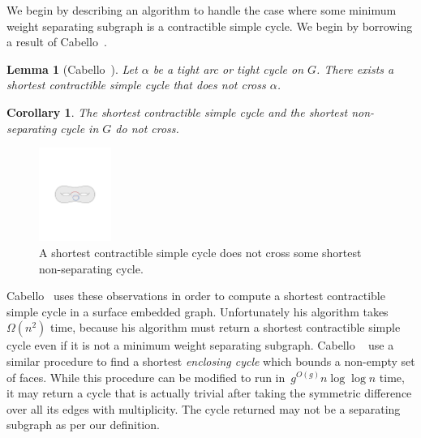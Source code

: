 \documentclass[11pt,twoside]{article}
\newtheorem{corollary}[theorem]{Corollary}
\newtheorem{lemma}[theorem]{Lemma}
\begin{document}
{We begin by describing an algorithm to handle the case where some minimum weight separating subgraph is a contractible simple cycle.
We begin by borrowing a result of Cabello~\cite[Lemma 4.1]{c-fscss-10}.

\begin{lemma}[Cabello~\cite{c-fscss-10}]
\label{lem:disjoint-tight-arc}
Let $\alpha$ be a tight arc or tight cycle on $G$.  There exists a shortest contractible simple cycle that does not cross $\alpha$.
\end{lemma}

\begin{corollary}
\label{cor:disjoint-sep-cycle}
The shortest contractible simple cycle and the shortest non-separating cycle in $G$ do not cross.
\end{corollary}

\begin{figure}[ht]
\centering
\includegraphics[height=1.2in]{Fig/shortcon-vs-shortnonsep}
\caption{A shortest contractible simple cycle does not cross some shortest non-separating cycle.}
\label{fig:global_shortcon-vs-shortnonsep}
\end{figure}

Cabello~\cite{c-fscss-10} uses these observations in order to compute a shortest contractible simple cycle in a surface embedded graph.
Unfortunately his algorithm takes~$\Omega(n^2)$ time, because his algorithm must return a shortest contractible simple cycle even if it is not a minimum weight separating subgraph.
Cabello \etal~\cite{cdem-fotc-10} use a similar procedure to find a shortest \emph{enclosing cycle} which bounds a non-empty set of faces.
While this procedure can be modified to run in~$g^{O(g)} n \log \log n$ time, it may return a cycle that is actually trivial after taking the symmetric difference over all its edges with multiplicity.
The cycle returned may not be a separating subgraph as per our definition.

}
\end{document}

